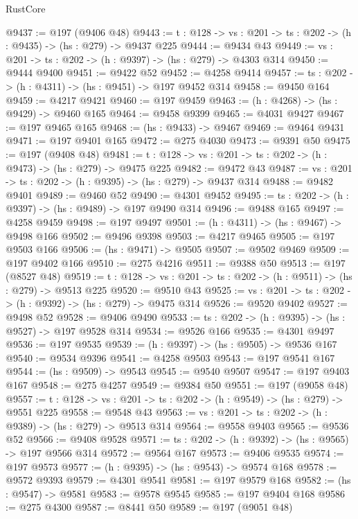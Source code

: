 \begin{lexlean}{RustCore}
\begin{coremodule}
@9437 := @197 (@9406 @48)
@9443 := {t : @128} -> {vs : @201} -> {ts : @202} -> (h : @9435) -> (hs : @279) -> @9437 @225
@9444 := @9434 @43
@9449 := {vs : @201} -> {ts : @202} -> (h : @9397) -> (hs : @279) -> @4303 @314
@9450 := @9444 @9400
@9451 := @9422 @52
@9452 := @4258 @9414
@9457 := {ts : @202} -> (h : @4311) -> (hs : @9451) -> @197 @9452 @314
@9458 := @9450 @164
@9459 := @4217 @9421
@9460 := @197 @9459
@9463 := (h : @4268) -> (hs : @9429) -> @9460 @165
@9464 := @9458 @9399
@9465 := @4031 @9427
@9467 := @197 @9465 @165
@9468 := (hs : @9433) -> @9467
@9469 := @9464 @9431
@9471 := @197 @9401 @165
@9472 := @275 @4030
@9473 := @9391 @50
@9475 := @197 (@9408 @48)
@9481 := {t : @128} -> {vs : @201} -> {ts : @202} -> (h : @9473) -> (hs : @279) -> @9475 @225
@9482 := @9472 @43
@9487 := {vs : @201} -> {ts : @202} -> (h : @9395) -> (hs : @279) -> @9437 @314
@9488 := @9482 @9401
@9489 := @9460 @52
@9490 := @4301 @9452
@9495 := {ts : @202} -> (h : @9397) -> (hs : @9489) -> @197 @9490 @314
@9496 := @9488 @165
@9497 := @4258 @9459
@9498 := @197 @9497
@9501 := (h : @4311) -> (hs : @9467) -> @9498 @166
@9502 := @9496 @9398
@9503 := @4217 @9465
@9505 := @197 @9503 @166
@9506 := (hs : @9471) -> @9505
@9507 := @9502 @9469
@9509 := @197 @9402 @166
@9510 := @275 @4216
@9511 := @9388 @50
@9513 := @197 (@8527 @48)
@9519 := {t : @128} -> {vs : @201} -> {ts : @202} -> (h : @9511) -> (hs : @279) -> @9513 @225
@9520 := @9510 @43
@9525 := {vs : @201} -> {ts : @202} -> (h : @9392) -> (hs : @279) -> @9475 @314
@9526 := @9520 @9402
@9527 := @9498 @52
@9528 := @9406 @9490
@9533 := {ts : @202} -> (h : @9395) -> (hs : @9527) -> @197 @9528 @314
@9534 := @9526 @166
@9535 := @4301 @9497
@9536 := @197 @9535
@9539 := (h : @9397) -> (hs : @9505) -> @9536 @167
@9540 := @9534 @9396
@9541 := @4258 @9503
@9543 := @197 @9541 @167
@9544 := (hs : @9509) -> @9543
@9545 := @9540 @9507
@9547 := @197 @9403 @167
@9548 := @275 @4257
@9549 := @9384 @50
@9551 := @197 (@9058 @48)
@9557 := {t : @128} -> {vs : @201} -> {ts : @202} -> (h : @9549) -> (hs : @279) -> @9551 @225
@9558 := @9548 @43
@9563 := {vs : @201} -> {ts : @202} -> (h : @9389) -> (hs : @279) -> @9513 @314
@9564 := @9558 @9403
@9565 := @9536 @52
@9566 := @9408 @9528
@9571 := {ts : @202} -> (h : @9392) -> (hs : @9565) -> @197 @9566 @314
@9572 := @9564 @167
@9573 := @9406 @9535
@9574 := @197 @9573
@9577 := (h : @9395) -> (hs : @9543) -> @9574 @168
@9578 := @9572 @9393
@9579 := @4301 @9541
@9581 := @197 @9579 @168
@9582 := (hs : @9547) -> @9581
@9583 := @9578 @9545
@9585 := @197 @9404 @168
@9586 := @275 @4300
@9587 := @8441 @50
@9589 := @197 (@9051 @48)

\end{coremodule}
\end{lexlean}
